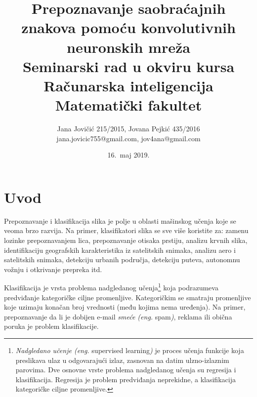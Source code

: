 \documentclass[a4paper]{article}
\begin{document}
\title{Prepoznavanje saobraćajnih znakova pomoću konvolutivnih neuronskih mreža\\ \small{Seminarski rad u okviru kursa\\Računarska inteligencija\\ Matematički fakultet}}

\author{Jana Jovičić 215/2015, Jovana Pejkić 435/2016 \\ jana.jovicic755@gmail.com, jov4ana@gmail.com}

\date{16.~maj 2019.}

\maketitle


\newpage

\tableofcontents

\newpage

\section{Uvod}
\label{sec:uvod}

Prepoznavanje i klasifikacija slika je polje u oblasti mašinskog učenja koje se veoma brzo razvija. Na primer, klasifikatori slika se sve više koristite za: zamenu lozinke prepoznavanjem lica, prepoznavanje otisaka prstiju, analizu krvnih slika, identifikaciju geografskih karakteristika iz satelitskih snimaka, analizu aero i satelitskih snimaka, detekciju urbanih područja, detekciju puteva, autonomnu vožnju i otkrivanje prepreka itd.

Klasifikacija je vrsta problema nadgledanog učenja\footnote{\textit{Nadgledano učenje (eng.} supervised learning\textit{)} je proces učenja funkcije koja preslikava ulaz u odgovarajući izlaz, zasnovan na datim ulzno-izlaznim parovima. Dve osnovne vrste problema nadgledanog učenja su regresija i klasifikacija. Regresija je problem predviđanja neprekidne, a klasifikacija kategoričke ciljne promenljive.} koja podrazumeva predviđanje kategoričke ciljne promenljive. Kategoričkim se smatraju promenljive koje uzimaju konačan broj vrednosti (među kojima nema uređenja). Na primer, prepoznavanje da li je dobijen e-mail \textit{smeće (eng.} spam\textit{)}, reklama ili obična poruka je problem klasifikacije.
\end{document}
